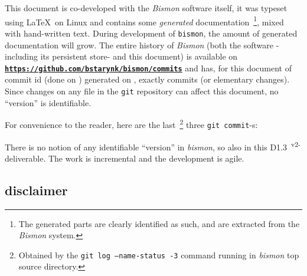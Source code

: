 \documentclass[11pt,a4paper,svgnames]{article}
\newcommand{\bmurl}[1]{{\href{#1}{\texttt{\textbf{#1}}}}}
\begin{document}
\begin{titlepage}
\begin{relsize}{-0.5}
This document is co-developed with the \emph{Bismon} software itself,
it was typeset using \LaTeX~on Linux and contains some \emph{generated}
documentation~\footnote{The generated parts are clearly identified as
  such, and are extracted from the \emph{Bismon} system.}, mixed with
hand-written text. During development of \texttt{bismon}, the amount
of generated documentation will grow.  The entire history of
\emph{Bismon} (both the software -including its persistent store- and
this document) is available on
\bmurl{https://github.com/bstarynk/bismon/commits} and has, for this
document of commit id \texttt{\bmgitcommit} (done on \emph{\bmgitdate}) generated on
\textit{\bmdocdate}, exactly {\bmgitnumbercommits} commits (or
elementary changes). Since changes on any file in the \texttt{git}
repository can affect this document, no ``version'' is identifiable.
\end{relsize}
\bigskip

For convenience to the reader, here are the last~\footnote{Obtained by the
  \texttt{git log --name-status -3} command running in \emph{bismon}
  top source directory.} three \texttt{git commit}-s:

\begin{relsize}{-2}
  
\end{relsize}

There is no notion of any identifiable ``version'' in \emph{bismon}, so
also in this D1.3~\textsuperscript{v2-} deliverable. The work is incremental and the
development is agile.

\bigskip

\subsection*{disclaimer}

\begin{center}
\end{center}
\end{titlepage}
\end{document}
